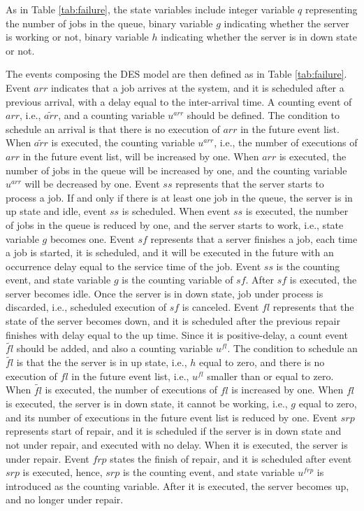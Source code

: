 \documentclass[]{interact}
\theoremstyle{plain}%
\theoremstyle{definition}
\theoremstyle{remark}
\begin{document}
As in Table \ref{tab:failure}, the state variables include integer variable $q$ representing the number of jobs in the queue, binary variable $g$ indicating whether the server is working or not, binary variable $h$ indicating whether the server is in down state or not.%

The events composing the DES model are then defined as in Table \ref{tab:failure}. Event ${arr}$ indicates that a job arrives at the system, and it is scheduled after a previous arrival, with a delay equal to the inter-arrival time. A counting event of ${arr}$, i.e., ${\tilde{arr}}$, and a counting variable $u^{arr}$ should be defined. The condition to schedule an arrival is that there is no execution of ${arr}$ in the future event list. When ${\tilde{arr}}$ is executed, the counting variable $u^{arr}$, i.e., the number of executions of ${arr}$ in the future event list, will be increased by one. When ${arr}$ is executed, the number of jobs in the queue will be increased by one, and the counting variable $u^{arr}$ will be decreased by one. Event ${ss}$ represents that the server starts to process a job. If and only if there is at least one job in the queue, the server is in up state and idle, event ${ss}$ is scheduled. When event ${ss}$ is executed, the number of jobs in the queue is reduced by one, and the server starts to work, i.e., state variable $g$ becomes one. Event ${sf}$ represents that a server finishes a job, each time a job is started, it is scheduled, and it will be executed in the future with an occurrence delay equal to the service time of the job. Event ${ss}$ is the counting event, and state variable $g$ is the counting variable of ${sf}$. After ${sf}$ is executed, the server becomes idle. Once the server is in down state, job under process is discarded, i.e., scheduled execution of ${sf}$ is canceled. Event ${fl}$ represents that the state of the server becomes down, and it is scheduled after the previous repair finishes with delay equal to the up time. Since it is positive-delay, a count event ${\tilde{fl}}$ should be added, and also a counting variable $u^{fl}$. The condition to schedule an ${\tilde{fl}}$ is that the the server is in up state, i.e., $h$ equal to zero, and there is no execution of ${fl}$ in the future event list, i.e., $u^{fl}$ smaller than or equal to zero. When ${\tilde{fl}}$ is executed, the number of executions of ${fl}$ is increased by one. When ${fl}$ is executed, the server is in down state, it cannot be working, i.e., $g$ equal to zero, and its number of executions in the future event list is reduced by one. Event ${srp}$ represents start of repair, and it is scheduled if the server is in down state and not under repair, and executed with no delay. When it is executed, the server is under repair. Event ${frp}$ states the finish of repair, and it is scheduled after event ${srp}$ is executed, hence, ${srp}$ is the counting event, and state variable $u^{frp}$ is introduced as the counting variable. After it is executed, the server becomes up, and no longer under repair. %
\end{document}
